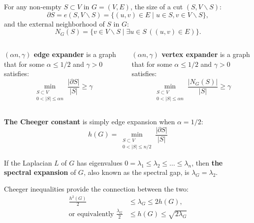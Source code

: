\documentclass{beamer}
\newcommand{\autotitle}{\secname\ifdefempty{\subsecname}{}{~--- \subsecname}}
\newcommand{\smalldisplayskips}{
    \setlength{\abovedisplayskip}{3pt}
    \setlength{\belowdisplayskip}{3pt}}
\newcommand{\normaldisplayskips}{
    \setlength{\abovedisplayskip}{8pt}
    \setlength{\belowdisplayskip}{8pt}}
\begin{document}
\begin{frame}{\autotitle}
    \smalldisplayskips
    For any non-empty $S\subset V$ in $G=(V,E)$, the size of a cut $(S,V\backslash S)$:
    \begin{equation*}
        \partial S=e(S,V\backslash S)=\{(u,v)\in E\;|\;u\in S,v\in V\backslash S\},
    \end{equation*}
    and the external neighborhood of $S$ in $G$:
    \begin{equation*}
        N_G(S)=\{v\in V\backslash S\;|\;\exists u\in S\,((u,v)\in E)\}.
    \end{equation*}
    \normaldisplayskips
    
    \begin{columns}[T,onlytextwidth]
        \textbf{$(\alpha n,\gamma)$ edge expander} is a graph
        that for some $\alpha\leq 1/2$ and $\gamma>0$ satisfies:
        \begin{equation*}
            \min_{\substack{S\subset V\\0<|S|\leq\alpha n}}\frac{|\partial S|}{|S|}\geq\gamma
        \end{equation*}
        
        \textbf{$(\alpha n,\gamma)$ vertex expander} is a graph
        that for some $\alpha\leq 1/2$ and $\gamma>0$ satisfies:
        \begin{equation*}
            \min_{\substack{S\subset V\\0<|S|\leq\alpha n}}\frac{|N_G(S)|}{|S|}\geq\gamma
        \end{equation*}
    \end{columns}
\end{frame}

\begin{frame}{\autotitle}
    \textbf{The Cheeger constant} is simply edge expansion when $\alpha=1/2$:
    \begin{equation*}
        h(G)=\min_{\substack{S\subset V\\0<|S|\leq n/2}}\frac{|\partial S|}{|S|}
    \end{equation*}
    
    If the Laplacian $L$ of $G$ has eigenvalues
    $0=\lambda_1 \leq \lambda_2 \leq \dots \leq \lambda_{n}$,
    then \textbf{the spectral expansion} of $G$, also known as the spectral gap,
    is $\lambda_G=\lambda_2$.
    
    Cheeger inequalities provide the connection between the two:
    \begin{align*}
        \frac{h^2(G)}{2}&\leq\lambda_G\leq 2h(G),\\
        \text{or equivalently }\frac{\lambda_G}{2}&\leq h(G)\leq\sqrt{2\lambda_G}
    \end{align*}
\end{frame}
\end{document}
